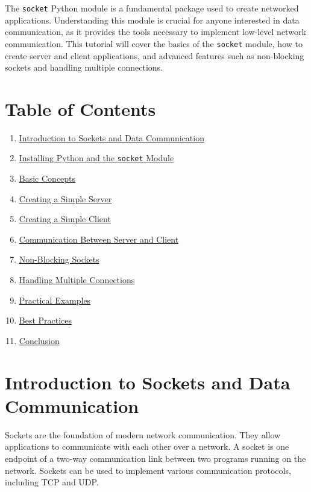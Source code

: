\documentclass[
  letterpaper,
  DIV=11,
  numbers=noendperiod]{scrreprt}
\providecommand{\tightlist}{%
  \setlength{\itemsep}{0pt}\setlength{\parskip}{0pt}}\usepackage{longtable,booktabs,array}
\begin{document}
The \texttt{socket} Python module is a fundamental package used to
create networked applications. Understanding this module is crucial for
anyone interested in data communication, as it provides the tools
necessary to implement low-level network communication. This tutorial
will cover the basics of the \texttt{socket} module, how to create
server and client applications, and advanced features such as
non-blocking sockets and handling multiple connections.

\section{Table of Contents}\label{table-of-contents-16}

\begin{enumerate}
\def\labelenumi{\arabic{enumi}.}
\tightlist
\item
  \hyperref[introduction-to-sockets-and-data-communication]{Introduction
  to Sockets and Data Communication}
\item
  \hyperref[installing-python-and-the-socket-module]{Installing Python
  and the \texttt{socket} Module}
\item
  \hyperref[basic-concepts]{Basic Concepts}
\item
  \hyperref[creating-a-simple-server]{Creating a Simple Server}
\item
  \hyperref[creating-a-simple-client]{Creating a Simple Client}
\item
  \hyperref[communication-between-server-and-client]{Communication
  Between Server and Client}
\item
  \hyperref[non-blocking-sockets]{Non-Blocking Sockets}
\item
  \hyperref[handling-multiple-connections]{Handling Multiple
  Connections}
\item
  \hyperref[practical-examples]{Practical Examples}
\item
  \hyperref[best-practices]{Best Practices}
\item
  \hyperref[conclusion]{Conclusion}
\end{enumerate}

\section{Introduction to Sockets and Data
Communication}\label{introduction-to-sockets-and-data-communication}

Sockets are the foundation of modern network communication. They allow
applications to communicate with each other over a network. A socket is
one endpoint of a two-way communication link between two programs
running on the network. Sockets can be used to implement various
communication protocols, including TCP and UDP.
\end{document}
